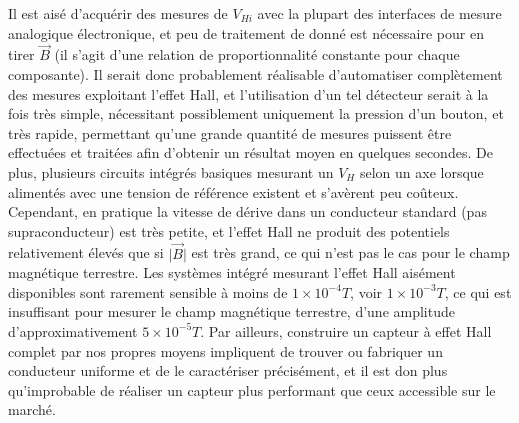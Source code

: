 \documentclass{standalone}
\begin{document}
Il est aisé d'acquérir des mesures de $V_{Hi}$ avec la plupart des interfaces de mesure analogique électronique, et peu de traitement de donné est nécessaire pour en tirer $\vec{B}$ (il s'agit d'une relation de proportionnalité constante pour chaque composante). Il serait donc probablement réalisable d'automatiser complètement des mesures exploitant l'effet Hall, et l'utilisation d'un tel détecteur serait à la fois très simple, nécessitant possiblement uniquement la pression d'un bouton, et très rapide, permettant qu'une grande quantité de mesures puissent être effectuées et traitées afin d'obtenir un résultat moyen en quelques secondes.
 De plus, plusieurs circuits intégrés basiques mesurant un $V_H$ selon un axe lorsque alimentés avec une tension de référence existent et s'avèrent peu coûteux.
Cependant, en pratique la vitesse de dérive dans un conducteur standard (pas supraconducteur) est très petite, et l'effet Hall ne produit des potentiels relativement élevés que si $\vert\vec{B}\vert$ est très grand, ce qui n'est pas le cas pour le champ magnétique terrestre. Les systèmes intégré mesurant l'effet Hall aisément disponibles sont rarement sensible à moins de $1\times10^{-4} \textit{T}$, voir  $1\times10^{-3} \textit{T}$, ce qui est insuffisant pour mesurer le champ magnétique terrestre, d'une amplitude d'approximativement $5\times10^{-5} \textit{T}$. Par ailleurs, construire un capteur à effet Hall complet par nos propres moyens impliquent de trouver ou fabriquer un conducteur uniforme et de le caractériser précisément, et il est don plus qu'improbable de réaliser un capteur plus performant que ceux accessible sur le marché.
\end{document}
